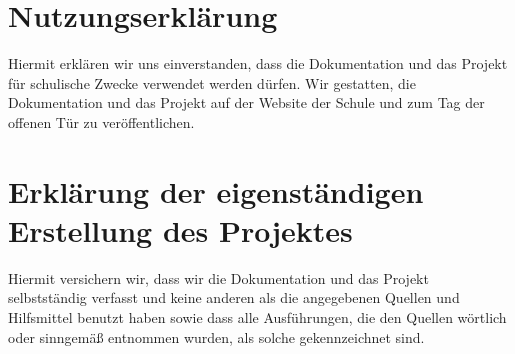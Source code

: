 \documentclass[11pt, oneside, halfparskip, smallheadings, automark]{scrreprt}
\begin{document}


\tableofcontents

%









\begingroup
\let\clearpage\relax

\newpage

\listoffigures
\lstlistoflistings
\listoftables

\newpage

\chapter*{Nutzungserklärung}
Hiermit erklären wir uns einverstanden, dass die Dokumentation und das Projekt für
schulische Zwecke verwendet werden dürfen. Wir gestatten, die Dokumentation und das Projekt auf der Website der Schule und zum Tag der offenen Tür zu veröffentlichen.

\chapter*{Erklärung der eigenständigen Erstellung des Projektes}
Hiermit versichern wir, dass wir die Dokumentation und das Projekt selbstständig verfasst und
keine anderen als die angegebenen Quellen und Hilfsmittel benutzt haben sowie dass alle
Ausführungen, die den Quellen wörtlich oder sinngemäß entnommen wurden, als solche
gekennzeichnet sind.
\endgroup
\end{document}
